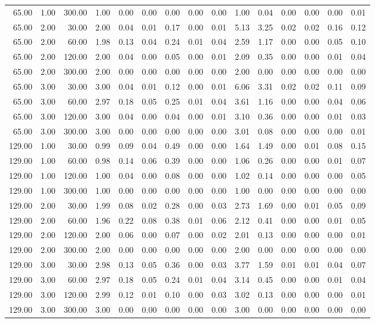 \begin{table}[ht]
\begin{tabular}{rrrrrrrrrrrrrrr}
  65.00 & 1.00 & 300.00 & 1.00 & 0.00 & 0.00 & 0.00 & 0.00 & 0.00 & 1.00 & 0.04 & 0.00 & 0.00 & 0.00 & 0.01 \\ 
  65.00 & 2.00 & 30.00 & 2.00 & 0.04 & 0.01 & 0.17 & 0.00 & 0.01 & 5.13 & 3.25 & 0.02 & 0.02 & 0.16 & 0.12 \\ 
  65.00 & 2.00 & 60.00 & 1.98 & 0.13 & 0.04 & 0.24 & 0.01 & 0.04 & 2.59 & 1.17 & 0.00 & 0.00 & 0.05 & 0.10 \\ 
  65.00 & 2.00 & 120.00 & 2.00 & 0.04 & 0.00 & 0.05 & 0.00 & 0.01 & 2.09 & 0.35 & 0.00 & 0.00 & 0.01 & 0.04 \\ 
  65.00 & 2.00 & 300.00 & 2.00 & 0.00 & 0.00 & 0.00 & 0.00 & 0.00 & 2.00 & 0.00 & 0.00 & 0.00 & 0.00 & 0.00 \\ 
  65.00 & 3.00 & 30.00 & 3.00 & 0.04 & 0.01 & 0.12 & 0.00 & 0.01 & 6.06 & 3.31 & 0.02 & 0.02 & 0.11 & 0.09 \\ 
  65.00 & 3.00 & 60.00 & 2.97 & 0.18 & 0.05 & 0.25 & 0.01 & 0.04 & 3.61 & 1.16 & 0.00 & 0.00 & 0.04 & 0.06 \\ 
  65.00 & 3.00 & 120.00 & 3.00 & 0.04 & 0.00 & 0.04 & 0.00 & 0.01 & 3.10 & 0.36 & 0.00 & 0.00 & 0.01 & 0.03 \\ 
  65.00 & 3.00 & 300.00 & 3.00 & 0.00 & 0.00 & 0.00 & 0.00 & 0.00 & 3.01 & 0.08 & 0.00 & 0.00 & 0.00 & 0.01 \\ 
  129.00 & 1.00 & 30.00 & 0.99 & 0.09 & 0.04 & 0.49 & 0.00 & 0.00 & 1.64 & 1.49 & 0.00 & 0.01 & 0.08 & 0.15 \\ 
  129.00 & 1.00 & 60.00 & 0.98 & 0.14 & 0.06 & 0.39 & 0.00 & 0.00 & 1.06 & 0.26 & 0.00 & 0.00 & 0.01 & 0.07 \\ 
  129.00 & 1.00 & 120.00 & 1.00 & 0.04 & 0.00 & 0.08 & 0.00 & 0.00 & 1.02 & 0.14 & 0.00 & 0.00 & 0.00 & 0.05 \\ 
  129.00 & 1.00 & 300.00 & 1.00 & 0.00 & 0.00 & 0.00 & 0.00 & 0.00 & 1.00 & 0.00 & 0.00 & 0.00 & 0.00 & 0.00 \\ 
  129.00 & 2.00 & 30.00 & 1.99 & 0.08 & 0.02 & 0.28 & 0.00 & 0.03 & 2.73 & 1.69 & 0.00 & 0.01 & 0.05 & 0.09 \\ 
  129.00 & 2.00 & 60.00 & 1.96 & 0.22 & 0.08 & 0.38 & 0.01 & 0.06 & 2.12 & 0.41 & 0.00 & 0.00 & 0.01 & 0.05 \\ 
  129.00 & 2.00 & 120.00 & 2.00 & 0.06 & 0.00 & 0.07 & 0.00 & 0.02 & 2.01 & 0.13 & 0.00 & 0.00 & 0.00 & 0.01 \\ 
  129.00 & 2.00 & 300.00 & 2.00 & 0.00 & 0.00 & 0.00 & 0.00 & 0.00 & 2.00 & 0.00 & 0.00 & 0.00 & 0.00 & 0.00 \\ 
  129.00 & 3.00 & 30.00 & 2.98 & 0.13 & 0.05 & 0.36 & 0.00 & 0.03 & 3.77 & 1.59 & 0.01 & 0.01 & 0.04 & 0.07 \\ 
  129.00 & 3.00 & 60.00 & 2.97 & 0.18 & 0.05 & 0.24 & 0.01 & 0.04 & 3.14 & 0.45 & 0.00 & 0.00 & 0.01 & 0.04 \\ 
  129.00 & 3.00 & 120.00 & 2.99 & 0.12 & 0.01 & 0.10 & 0.00 & 0.03 & 3.02 & 0.13 & 0.00 & 0.00 & 0.00 & 0.01 \\ 
  129.00 & 3.00 & 300.00 & 3.00 & 0.00 & 0.00 & 0.00 & 0.00 & 0.00 & 3.00 & 0.00 & 0.00 & 0.00 & 0.00 & 0.00 \\ 
   \hline
\end{tabular}
\end{table}
